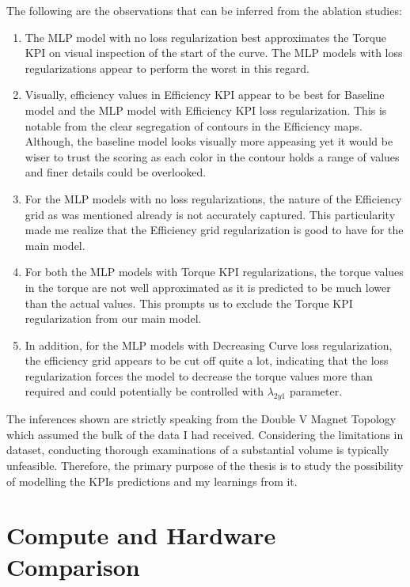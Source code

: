 \documentclass{report} %
\begin{document}
The following are the observations that can be inferred from the ablation studies:
\begin{enumerate}[nosep]
    \item The \ac{MLP} model with no loss regularization best approximates the Torque \ac{KPI} on visual inspection of the start of the curve.
    The \ac{MLP} models with loss regularizations appear to perform the worst in this regard.
    \item Visually, efficiency values in Efficiency \ac{KPI} appear to be best for Baseline model and the \ac{MLP} model with Efficiency \ac{KPI} loss regularization.
    This is notable from the clear segregation of contours in the Efficiency maps. Although, the baseline model looks visually more appeasing yet it would be 
    wiser to trust the scoring as each color in the contour holds a range of values and finer details could be overlooked.
    \item For the \ac{MLP} models with no loss regularizations, the nature of the Efficiency grid as was mentioned already is not accurately captured. 
    This particularity made me realize that the Efficiency grid regularization is good to have for the main model.
    \item For both the \ac{MLP} models with Torque \ac{KPI} regularizations, the torque values in the torque are not well approximated as it is predicted to be much lower 
    than the actual values. This prompts us to exclude the Torque \ac{KPI} regularization from our main model.
    \item In addition, for the \ac{MLP} models with Decreasing Curve loss regularization, the efficiency grid appears to be cut off quite a lot, indicating that the 
    loss regularization forces the model to decrease the torque values more than required and could potentially be controlled with \textit{$\lambda_{2y1}$} parameter.\\
\end{enumerate}

The inferences shown are strictly speaking from the Double V Magnet Topology which assumed the bulk of the data I had received.
Considering the limitations in dataset, conducting thorough examinations of a substantial volume is typically unfeasible. 
Therefore, the primary purpose of the thesis is to study the possibility of modelling the \ac{KPI}s predictions and my learnings from it.

\section{Compute and Hardware Comparison}\label{sec:Time Comparison}
\end{document}
